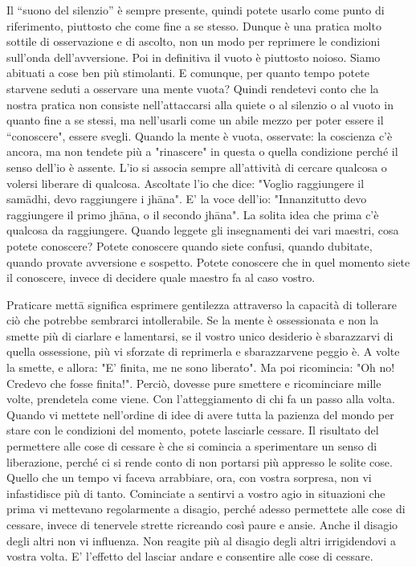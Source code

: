 Il “suono del silenzio” è sempre presente, quindi potete usarlo come
punto di riferimento, piuttosto che come fine a se stesso. Dunque è una
pratica molto sottile di osservazione e di ascolto, non un modo per
reprimere le condizioni sull'onda dell'avversione. Poi in definitiva il
vuoto è piuttosto noioso. Siamo abituati a cose ben più stimolanti. E
comunque, per quanto tempo potete starvene seduti a osservare una mente
vuota? Quindi rendetevi conto che la nostra pratica non consiste
nell'attaccarsi alla quiete o al silenzio o al vuoto in quanto fine a se
stessi, ma nell'usarli come un abile mezzo per poter essere il
“conoscere", essere svegli. Quando la mente è vuota, osservate: la
coscienza c'è ancora, ma non tendete più a "rinascere" in questa o
quella condizione perché il senso dell'io è assente. L'io si associa
sempre all'attività di cercare qualcosa o volersi liberare di qualcosa.
Ascoltate l'io che dice: "Voglio raggiungere il samādhi, devo
raggiungere i jhāna". E' la voce dell'io: "Innanzitutto devo raggiungere
il primo jhāna, o il secondo jhāna". La solita idea che prima c'è
qualcosa da raggiungere. Quando leggete gli insegnamenti dei vari
maestri, cosa potete conoscere? Potete conoscere quando siete confusi,
quando dubitate, quando provate avversione e sospetto. Potete conoscere
che in quel momento siete il conoscere, invece di decidere quale maestro
fa al caso vostro.

Praticare mettā significa esprimere gentilezza attraverso la capacità di
tollerare ciò che potrebbe sembrarci intollerabile. Se la mente è
ossessionata e non la smette più di ciarlare e lamentarsi, se il vostro
unico desiderio è sbarazzarvi di quella ossessione, più vi sforzate di
reprimerla e sbarazzarvene peggio è. A volte la smette, e allora: "E'
finita, me ne sono liberato". Ma poi ricomincia: "Oh no! Credevo che
fosse finita!". Perciò, dovesse pure smettere e ricominciare mille
volte, prendetela come viene. Con l'atteggiamento di chi fa un passo
alla volta. Quando vi mettete nell'ordine di idee di avere tutta la
pazienza del mondo per stare con le condizioni del momento, potete
lasciarle cessare. Il risultato del permettere alle cose di cessare è
che si comincia a sperimentare un senso di liberazione, perché ci si
rende conto di non portarsi più appresso le solite cose. Quello che un
tempo vi faceva arrabbiare, ora, con vostra sorpresa, non vi
infastidisce più di tanto. Cominciate a sentirvi a vostro agio in
situazioni che prima vi mettevano regolarmente a disagio, perché adesso
permettete alle cose di cessare, invece di tenervele strette ricreando
così paure e ansie. Anche il disagio degli altri non vi influenza. Non
reagite più al disagio degli altri irrigidendovi a vostra volta. E'
l'effetto del lasciar andare e consentire alle cose di cessare.

